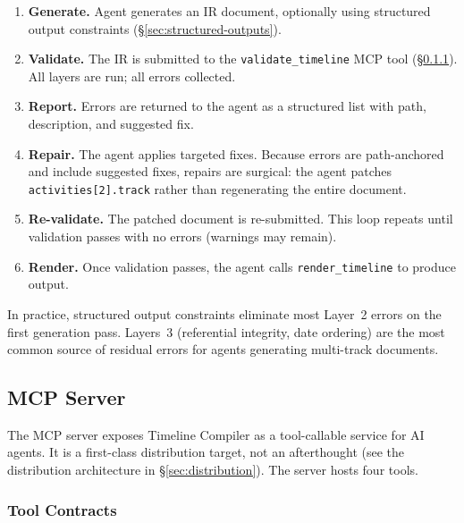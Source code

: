 \begin{enumerate}
  \item \textbf{Generate.} Agent generates an IR document, optionally using structured
        output constraints (\S\ref{sec:structured-outputs}).
  \item \textbf{Validate.} The IR is submitted to the \texttt{validate\_timeline} MCP
        tool (\S\ref{sec:mcp-tools}). All layers are run; all errors collected.
  \item \textbf{Report.} Errors are returned to the agent as a structured list with
        path, description, and suggested fix.
  \item \textbf{Repair.} The agent applies targeted fixes. Because errors are
        path-anchored and include suggested fixes, repairs are surgical: the agent
        patches \texttt{activities[2].track} rather than regenerating the entire document.
  \item \textbf{Re-validate.} The patched document is re-submitted. This loop repeats
        until validation passes with no errors (warnings may remain).
  \item \textbf{Render.} Once validation passes, the agent calls \texttt{render\_timeline}
        to produce output.
\end{enumerate}

In practice, structured output constraints eliminate most Layer~2 errors on the first
generation pass. Layers~3 (referential integrity, date ordering) are the most common
source of residual errors for agents generating multi-track documents.


\subsection{MCP Server}
\label{sec:mcp-server}

The MCP server \cite{mcp-spec} exposes Timeline Compiler as a tool-callable service for
AI agents. It is a first-class distribution target, not an afterthought (see the
distribution architecture in \S\ref{sec:distribution}). The server hosts four tools.

\subsubsection{Tool Contracts}
\label{sec:mcp-tools}

